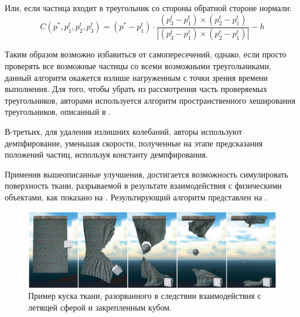 	Или, если частица входит в треугольник со стороны обратной стороне нормали:
	\begin{equation}
		C(p^*, p_1^t, p_2^t, p_3^t) = (p^* - p_1^t) \cdot \frac{(p_3^t - p_1^t) \times (p_2^t - p_1^t)}{|(p_3^t - p_1^t) \times (p_2^t - p_1^t)|} - h
	\end{equation}	
	
	Таким образом возможно избавиться от самопересечений, однако, если просто проверять все возможные частицы со всеми возможными треугольниками, данный алгоритм окажется излише нагруженным с точки зрения времени выполнения. Для того, чтобы убрать из рассмотрения часть проверяемых треугольников, авторами используется алгоритм пространственного хеширования треугольников, описанный в \cite{teschner2003optimized}.
	
	В-третьих, для удаления излишних колебаний, авторы используют демпфирование, уменьшая скорости, полученные на этапе предсказания положений частиц, используя константу демпфирования. 
	
	Применив вышеописанные улучшения, достигается возможность симулировать поверхность ткани, разрываемой в результате взаимодействия с физическими объектами, как показано на . Результирующий алгоритм представлен на .
	
	\begin{figure}[ht!] 
		\center
		\includegraphics [scale=0.3] {my_folder/images//tear_cloth}
		\caption{Пример куска ткани, разорванного в следствии взаимодействия с летящей сферой и закрепленным кубом.}
		\label{fig:tearcloth}  
	\end{figure}
	
